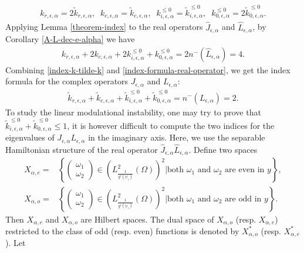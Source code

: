 \documentclass[1 [leqno, 11pt]{amsart}
\numberwithin{equation}{section}
\let\ep=\epsilon
\begin{document}
\begin{CJK*}{GBK}{song}
\begin{align}
k_{r,\ep,\alpha}=2\tilde k_{r,\ep,\alpha}, \;\; k_{c,\ep,\alpha}=\tilde k_{c,\ep,\alpha},\;\;k_{i,\ep,\alpha}^{\leq0}=\tilde k_{i,\ep,\alpha}^{\leq0},\;\;k_{0,\ep,\alpha}^{\leq0}=2\tilde k_{0,\ep,\alpha}^{\leq0}.
\end{align}
Applying Lemma \ref{theorem-index} to the real operators  $\hat{J}_{\ep,\alpha}$ and $\hat{L}_{\ep,\alpha}$, by Corollary \ref{A-L-dec-e-alpha} we have
\begin{align}\label{index-formula-real-operator}
k_{r,\ep,\alpha}+ 2k_{c,\ep,\alpha}+2k_{i,\ep,\alpha}^{\leq0}+k_{0,\ep,\alpha}^{\leq0}=2n^-\left(\hat{L}_{\ep,\alpha}\right)=4.
\end{align}
Combining \eqref{index-k-tilde-k} and \eqref{index-formula-real-operator}, we get the index formula for the complex operators  $J_{\ep,\alpha}$ and $L_{\ep,\alpha}$:
\begin{align*}
\tilde k_{r,\ep,\alpha}+ \tilde k_{c,\ep,\alpha}+\tilde k_{i,\ep,\alpha}^{\leq0}+\tilde k_{0,\ep,\alpha}^{\leq0}=n^-\left(L_{\ep,\alpha}\right)=2.
\end{align*}
To study the linear modulational instability, one may try to prove that $\tilde k_{i,\ep,\alpha}^{\leq0}+\tilde k_{0,\ep,\alpha}^{\leq0}\leq 1$, it is however difficult to compute the two indices for the eigenvalues  of $J_{\ep,\alpha}L_{\ep,\alpha}$ in the imaginary axis.
Here, we use the separable Hamiltonian structure of the real operator $\hat{J}_{\ep,\alpha}\hat{L}_{\ep,\alpha}$.
Define two spaces
\begin{align*}
X_{\alpha, e} =& \left\{ \left( \begin{array}{c} \omega_1 \\ \omega_2 \end{array} \right) \in \left(L^2_{\frac{1}{g'(\psi_\ep)}}(\Omega)\right)^2 \bigg| \text{both } \omega_1 \text{ and } \omega_2 \text{ are even  in }y \right\},\\
X_{\alpha, o} =& \left\{  \left( \begin{array}{c} \omega_1 \\ \omega_2 \end{array} \right) \in \left( L^2_{\frac{1}{g'(\psi_\ep)}}(\Omega)\right)^2\bigg| \text{both } \omega_1 \text{ and } \omega_2 \text{ are odd in }y \right\}.
\end{align*}
Then $X_{\alpha, e}$ and  $X_{\alpha, o}$ are  Hilbert spaces.
The dual space of  $X_{\alpha, o}$ (resp. $X_{\alpha, e}$) restricted to the class of odd (resp. even) functions is denoted by $X_{\alpha, o}^*$ (resp. $X_{\alpha, e}^*$).
Let

\end{CJK*}
\end{document}
